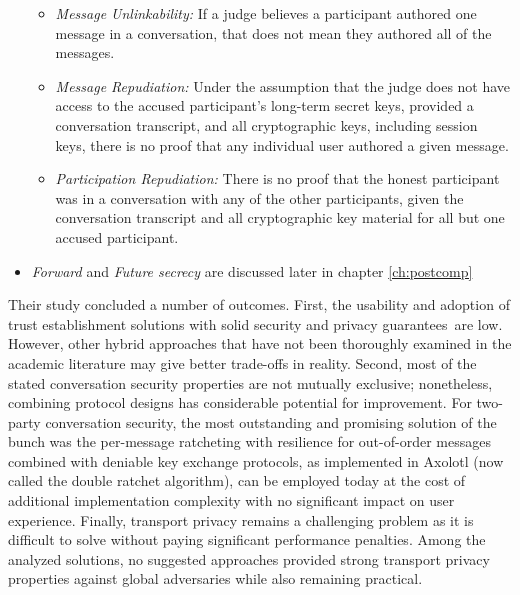 \begin{itemize}
	\begin{itemize}
		\item \textit{Message Unlinkability:} If a judge believes a participant authored one message in a conversation, that does not mean they authored all of the messages.
		
		\item \textit{Message Repudiation:} Under the assumption that the judge does not have access to the accused participant's long-term secret keys, provided a conversation transcript, and all cryptographic keys, including session keys, there is no proof that any individual user authored a given message.
		
		\item \textit{Participation Repudiation:} There is no proof that the honest participant was in a conversation with any of the other participants, given the conversation transcript and all cryptographic key material for all but one accused participant.
		
	\end{itemize}
	\item \textit{Forward} and \textit{Future secrecy} are discussed later in chapter \ref{ch:postcomp}
\end{itemize}
Their study concluded a number of outcomes.
First, the usability and adoption of trust establishment solutions with solid security and privacy guarantees are low. However, other hybrid approaches that have not been thoroughly examined in the academic literature may give better trade-offs in reality.
Second, most of the stated conversation security properties are not mutually exclusive; nonetheless, combining protocol designs has considerable potential for improvement. For two-party conversation security, the most outstanding and promising solution of the bunch was the per-message ratcheting with resilience for out-of-order messages combined with deniable key exchange protocols, as implemented in Axolotl (now called the double ratchet algorithm), can be employed today at the cost of additional implementation complexity with no significant impact on user experience. 
Finally, transport privacy remains a challenging problem as it is difficult to solve without paying significant performance penalties. Among the analyzed solutions, no suggested approaches provided strong transport privacy properties against global adversaries while also remaining practical.


